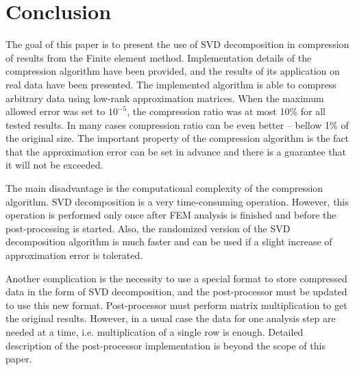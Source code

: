\section{Conclusion}
\label{sec:conclusion}

The goal of this paper is to present the use of SVD decomposition in compression of results from the Finite element method. Implementation details of the compression algorithm have been provided, and the results of its application on real data have been presented. The implemented algorithm is able to compress arbitrary data using low-rank approximation matrices. When the maximum allowed error was set to $10^{-5}$, the compression ratio was at most 10\% for all tested results. In many cases compression ratio can be even better -- bellow 1\% of the original size. The important property of the compression algorithm is the fact that the approximation error can be set in advance and there is a guarantee that it will not be exceeded.

The main disadvantage is the computational complexity of the compression algorithm. SVD decomposition is a very time-consuming operation. However, this operation is performed only once after FEM analysis is finished and before the post-processing is started. Also, the randomized version of the SVD decomposition algorithm is much faster and can be used if a slight increase of approximation error is tolerated.

Another complication is the necessity to use a special format to store compressed data in the form of SVD decomposition, and the post-processor must be updated to use this new format. Post-processor must perform matrix multiplication to get the original results. However, in a usual case the data for one analysis step are needed at a time, i.e. multiplication of a single row is enough. Detailed description of the post-processor implementation is beyond the scope of this paper.
